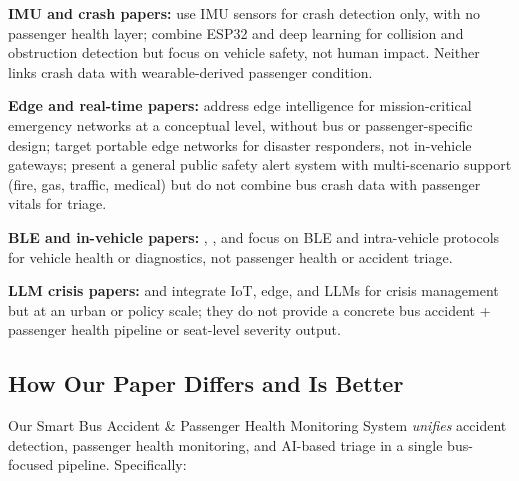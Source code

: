 \documentclass[conference]{IEEEtran}
\begin{document}
\textbf{IMU and crash papers:} \cite{ieee_crash_imu} use IMU sensors for crash detection only, with no passenger health layer; \cite{ieee_esp32_deep} combine ESP32 and deep learning for collision and obstruction detection but focus on vehicle safety, not human impact. Neither links crash data with wearable-derived passenger condition.

\textbf{Edge and real-time papers:} \cite{ieee_edge_mission} address edge intelligence for mission-critical emergency networks at a conceptual level, without bus or passenger-specific design; \cite{ieee_portable_edge_disaster} target portable edge networks for disaster responders, not in-vehicle gateways; \cite{ieee_realtime_iot_safety} present a general public safety alert system with multi-scenario support (fire, gas, traffic, medical) but do not combine bus crash data with passenger vitals for triage.

\textbf{BLE and in-vehicle papers:} \cite{ieee_ble_automobile}, \cite{ieee_ble_intra_vehicle}, and \cite{ieee_intra_vehicular_iot} focus on BLE and intra-vehicle protocols for vehicle health or diagnostics, not passenger health or accident triage.

\textbf{LLM crisis papers:} \cite{ieee_crisis_iot_edge_llm} and \cite{ieee_urban_emergency_llm} integrate IoT, edge, and LLMs for crisis management but at an urban or policy scale; they do not provide a concrete bus accident + passenger health pipeline or seat-level severity output.

\subsection{How Our Paper Differs and Is Better}

Our Smart Bus Accident \& Passenger Health Monitoring System \emph{unifies} accident detection, passenger health monitoring, and AI-based triage in a single bus-focused pipeline. Specifically:
\end{document}
